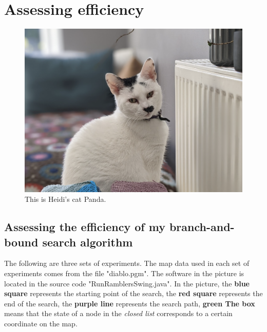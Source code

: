 \documentclass[
]{article}
\begin{document}
\section{Assessing efficiency}

\begin{figure}[ht]
\centering
  \includegraphics[scale=0.4]{./images/Panda.png}
  \caption{This is Heidi's cat Panda.}
  \label{fig:panda}
 \end{figure} 
 
\subsection{Assessing the efficiency of my branch-and-bound search algorithm}

The following are three sets of experiments. The map data used in each
set of experiments comes from the file "diablo.pgm". The software in the
picture is located in the source code "RunRamblersSwing.java". In the
picture, the \textbf{blue square} represents the starting point of the
search, the \textbf{red square} represents the end of the search, the
\textbf{purple line} represents the search path, \textbf{green The box}
means that the state of a node in the \emph{closed list} corresponds to
a certain coordinate on the map.
\end{document}
